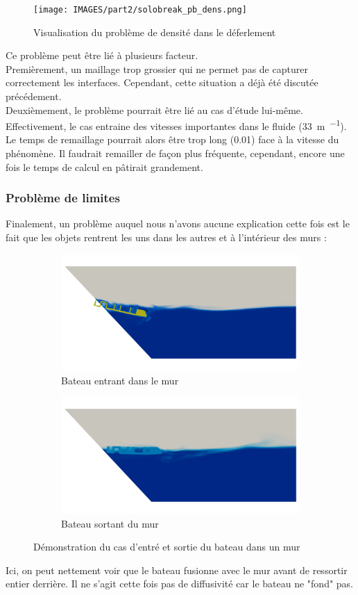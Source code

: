 \documentclass[../main.tex]{subfiles}
\begin{document}
\begin{figure}[H]
    \centering
    \texttt{[image: IMAGES/part2/solobreak\_pb\_dens.png]}
    \caption{Visualisation du problème de densité dans le déferlement}
\end{figure}

Ce problème peut être lié à plusieurs facteur.\\
Premièrement, un maillage trop grossier qui ne permet pas de capturer correctement les interfaces. Cependant, cette situation a déjà été discutée précédement.\\
Deuxièmement, le problème pourrait être lié au cas d'étude lui-même. Effectivement, le cas entraine des vitesses importantes dans le fluide (\qty{33}{\meter\per\sec}). Le temps de remaillage pourrait alors être trop long (\qty{0.01}{\sec}) face à la vitesse du phénomène. Il faudrait remailler de façon plus fréquente, cependant, encore une fois le temps de calcul en pâtirait grandement.

\subsubsection*{Problème de limites}
Finalement, un problème auquel nous n'avons aucune explication cette fois est le fait que les objets rentrent les uns dans les autres et à l'intérieur des murs :
\begin{figure}
\centering
\begin{subfigure}[b]{11cm}
    \centering
    \includegraphics[width=11cm]{IMAGES/part2/zephyr_launching.0089.png}
    \caption{Bateau entrant dans le mur}
\end{subfigure}
\vfill
\begin{subfigure}[b]{11cm}
    \centering
    \includegraphics[width=11cm]{IMAGES/part2/wall_pb.png}
    \caption{Bateau sortant du mur}
\end{subfigure}
\caption{Démonstration du cas d'entré et sortie du bateau dans un mur}
\end{figure}

Ici, on peut nettement voir que le bateau fusionne avec le mur avant  de ressortir entier derrière. Il ne s'agit cette fois pas de diffusivité car le bateau ne "fond" pas.
\end{document}

